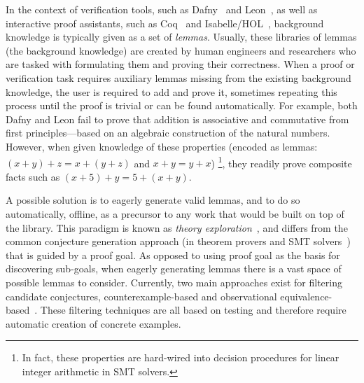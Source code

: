 In the context of verification tools, such as Dafny~\cite{LPAIR2010:Rustan} and Leon~\cite{SCALA13:Blanc}, as well as interactive proof assistants, such as 
Coq~\cite{Coq:manual} and Isabelle/HOL~\cite{Book2002:Nipkow},
background knowledge is typically given as a set of \emph{lemmas}.
Usually, these libraries of lemmas (\ie the background knowledge) are created by human engineers and researchers who are tasked with formulating them and proving their correctness.
When a proof or verification task requires auxiliary lemmas missing from the existing background knowledge, 
the user is required to add and prove it, sometimes repeating this process until the proof is trivial or can be found automatically.
For example, both Dafny and Leon fail to prove that addition is associative and commutative from first principles---based on an algebraic construction of the natural numbers.
However, when given knowledge of these properties (\ie encoded as lemmas: $(x + y) + z = x + (y + z)$ and $x + y = y + x$)%
\footnote{In fact, these properties are hard-wired into decision procedures for linear integer arithmetic in SMT solvers.}, they readily prove composite facts such as
$(x + 5) + y = 5 + (x + y)$.


\begin{comment}
Auxiliary propositions, such as the aforementioned properties of addition, are usually stored as part of one or more libraries
that are utilized by a reasoning tool such as a prover or a compiler.
Notable examples for this are the standard libraries of popular proof assistants
and the rewrite rules used by the Haskell compiler GHC for
performing optimizations such as Stream Fusion~\cite{SIGPLAN-Notices2007:Coutts}.
These libraries are written by expert developers over the course of years, and tend to grow quite large, making them hard to use and to maintain.
\end{comment}

A possible solution is to eagerly generate valid lemmas, and to do so automatically, offline,
as a precursor to any work that would be built on top of the library.
This paradigm is known as \emph{theory exploration}~\cite{Journal2002:Buchberger,JAL2006:Buchberger}, and differs from the common conjecture generation approach (in theorem provers and SMT solvers~\cite{cvc4induction}) that is guided by a proof goal.
As opposed to using proof goal as the basis for discovering sub-goals, when eagerly generating lemmas there is a vast space of possible lemmas to consider.
Currently, two main approaches exist for filtering candidate conjectures, counterexample-based and observational equivalence-based~\cite{JAR2010:Johansson,2018AISC:Einarsdottir,hipster,hipstercond}.
These filtering techniques are all based on testing and therefore require automatic creation of concrete examples.

